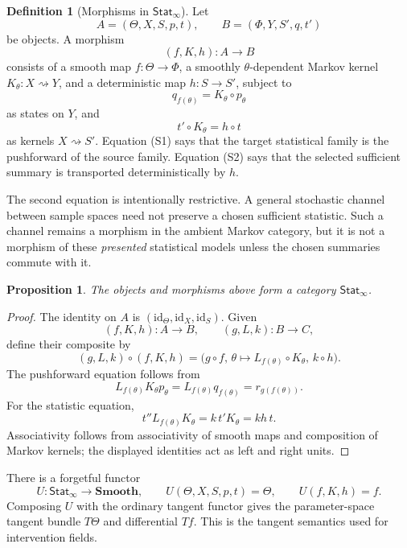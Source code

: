 \documentclass{article}
\theoremstyle{plain}
\newtheorem{proposition}[theorem]{Proposition}
\theoremstyle{definition}
\newtheorem{definition}[theorem]{Definition}
\theoremstyle{remark}
\newcommand{\id}{\mathrm{id}}
\newcommand{\StatInf}{\mathsf{Stat}_{\infty}}
\begin{document}
\begin{definition}[Morphisms in \(\StatInf\)]
\label{def:statinf-morphism}
Let
\[
  A=(\Theta,X,S,p,t),
  \qquad
  B=(\Phi,Y,S',q,t')
\]
be objects.  A morphism
\[
  (f,K,h):A\longrightarrow B
\]
consists of a smooth map \(f:\Theta\to\Phi\), a smoothly
\(\theta\)-dependent Markov kernel \(K_\theta:X\rightsquigarrow Y\), and a
deterministic map \(h:S\to S'\), subject to
\[
  q_{f(\theta)}=K_\theta\circ p_\theta
  \tag{S1}
\]
as states on \(Y\), and
\[
  t'\circ K_\theta=h\circ t
  \tag{S2}
\]
as kernels \(X\rightsquigarrow S'\).  Equation (S1) says that the target
statistical family is the pushforward of the source family.  Equation (S2)
says that the selected sufficient summary is transported deterministically by
\(h\).
\end{definition}

The second equation is intentionally restrictive.  A general stochastic
channel between sample spaces need not preserve a chosen sufficient statistic.
Such a channel remains a morphism in the ambient Markov category, but it is not
a morphism of these \emph{presented} statistical models unless the chosen
summaries commute with it.

\begin{proposition}
\label{prop:statinf-category}
The objects and morphisms above form a category \(\StatInf\).
\end{proposition}

\begin{proof}
The identity on \(A\) is
\((\id_\Theta,\id_X,\id_S)\).  Given
\[
  (f,K,h):A\to B,
  \qquad
  (g,L,k):B\to C,
\]
define their composite by
\[
  (g,L,k)\circ(f,K,h)
  =
  \bigl(g\circ f,\,
        \theta\mapsto L_{f(\theta)}\circ K_\theta,\,
        k\circ h\bigr).
\]
The pushforward equation follows from
\[
  L_{f(\theta)}K_\theta p_\theta
  =
  L_{f(\theta)}q_{f(\theta)}
  =
  r_{g(f(\theta))}.
\]
For the statistic equation,
\[
  t''L_{f(\theta)}K_\theta
  =
  k\,t'K_\theta
  =
  kh\,t.
\]
Associativity follows from associativity of smooth maps and composition of
Markov kernels; the displayed identities act as left and right units.
\end{proof}

There is a forgetful functor
\[
  U:\StatInf\longrightarrow\mathbf{Smooth},
  \qquad
  U(\Theta,X,S,p,t)=\Theta,
  \qquad
  U(f,K,h)=f.
\]
Composing \(U\) with the ordinary tangent functor gives the parameter-space
tangent bundle \(T\Theta\) and differential \(Tf\).  This is the tangent
semantics used for intervention fields.
\end{document}
